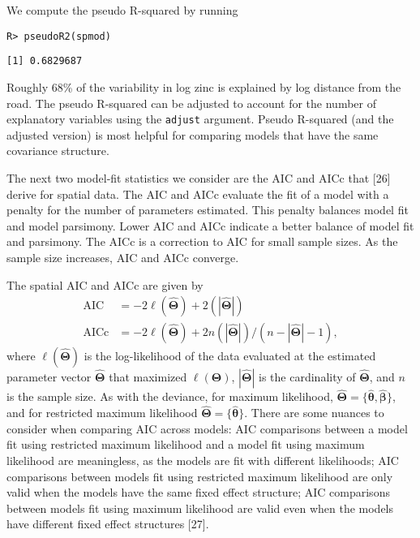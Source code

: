 \documentclass[10pt,letterpaper]{article}
\begin{document}
We compute the pseudo R-squared by running

\begin{verbatim}
R> pseudoR2(spmod)
\end{verbatim}

\begin{verbatim}
[1] 0.6829687
\end{verbatim}

Roughly 68\% of the variability in log zinc is explained by log distance
from the road. The pseudo R-squared can be adjusted to account for the
number of explanatory variables using the \texttt{adjust} argument.
Pseudo R-squared (and the adjusted version) is most helpful for
comparing models that have the same covariance structure.

The next two model-fit statistics we consider are the AIC and AICc that
{[}26{]} derive for spatial data. The AIC and AICc evaluate the fit of a
model with a penalty for the number of parameters estimated. This
penalty balances model fit and model parsimony. Lower AIC and AICc
indicate a better balance of model fit and parsimony. The AICc is a
correction to AIC for small sample sizes. As the sample size increases,
AIC and AICc converge.

The spatial AIC and AICc are given by \begin{equation*}\label{eq:sp_aic}
  \begin{split}
    \text{AIC} & = -2\ell(\hat{\boldsymbol{\Theta}}) + 2(|\hat{\boldsymbol{\Theta}}|) \\
    \text{AICc} & = -2\ell(\hat{\boldsymbol{\Theta}}) + 2n(|\hat{\boldsymbol{\Theta}}|) / (n - |\hat{\boldsymbol{\Theta}}| - 1),
  \end{split}
\end{equation*} where \(\ell(\hat{\boldsymbol{\Theta}})\) is the
log-likelihood of the data evaluated at the estimated parameter vector
\(\hat{\boldsymbol{\Theta}}\) that maximized
\(\ell(\boldsymbol{\Theta})\), \(|\hat{\boldsymbol{\Theta}}|\) is the
cardinality of \(\hat{\boldsymbol{\Theta}}\), and \(n\) is the sample
size. As with the deviance, for maximum likelihood,
\(\hat{\boldsymbol{\Theta}} = \{\hat{\boldsymbol{\theta}}, \hat{\boldsymbol{\beta}}\}\),
and for restricted maximum likelihood
\(\hat{\boldsymbol{\Theta}} = \{\hat{\boldsymbol{\theta}}\}\). There are
some nuances to consider when comparing AIC across models: AIC
comparisons between a model fit using restricted maximum likelihood and
a model fit using maximum likelihood are meaningless, as the models are
fit with different likelihoods; AIC comparisons between models fit using
restricted maximum likelihood are only valid when the models have the
same fixed effect structure; AIC comparisons between models fit using
maximum likelihood are valid even when the models have different fixed
effect structures {[}27{]}.
\end{document}
